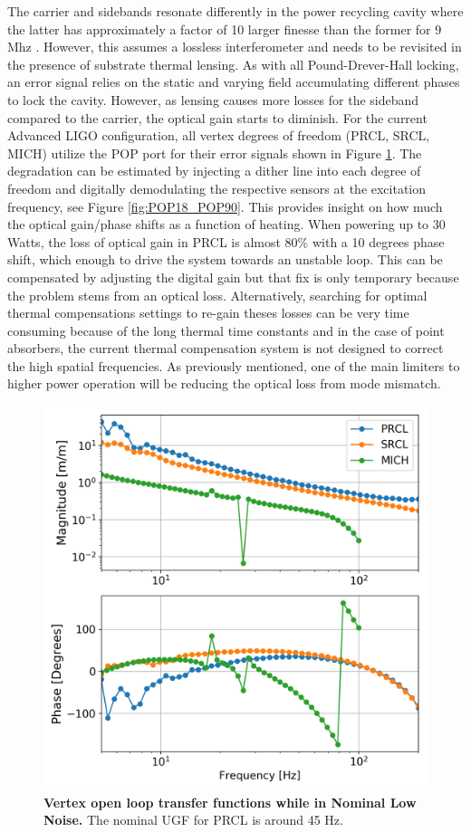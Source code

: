 	The carrier and sidebands resonate differently in the power recycling cavity where the latter has approximately a factor of 10 larger finesse than the former for 9 Mhz \cite{kiwamu_freq1}.  However, this assumes a lossless interferometer and needs to be revisited in the presence of substrate thermal lensing.   As with all Pound-Drever-Hall locking, an error signal relies on the static and varying field accumulating different phases to lock the cavity. However, as lensing causes more losses for the sideband compared to the carrier, the optical gain starts to diminish.  For the current Advanced LIGO configuration, all vertex degrees of freedom (PRCL, SRCL, MICH) utilize the POP port for their error signals shown in Figure \ref{fig:vertex_OLTF}. The degradation can be estimated by injecting a dither line into each degree of freedom and digitally demodulating the respective sensors at the excitation frequency, see Figure \ref{fig:POP18_POP90}.  This provides insight on how much the optical gain/phase shifts as a function of heating.  When powering up to 30 Watts, the loss of optical gain in PRCL is almost 80\% with a 10 degrees phase shift, which enough to drive the system towards an unstable loop.  This can be compensated by adjusting the digital gain but that fix is only temporary because the problem stems from an optical loss.  Alternatively, searching for optimal thermal compensations settings to re-gain theses losses can be very time consuming because of the long thermal time constants and in the case of point absorbers, the current thermal compensation system is not designed to correct the high spatial frequencies.  As previously mentioned, one of the main limiters to higher power operation will be reducing the optical loss from mode mismatch.

	\begin{figure}[t!]
		\centering
		\includegraphics[width=0.75 \textwidth]{../Figures/MeasuredVertexOLF.png}
		\caption[Vertex open loop transfer functions while in Nominal Low Noise.]  
		{\textbf{Vertex open loop transfer functions while in Nominal Low Noise.}
			The nominal UGF for PRCL is around 45 Hz.
		}
		\label{fig:vertex_OLTF}
	\end{figure}
	
